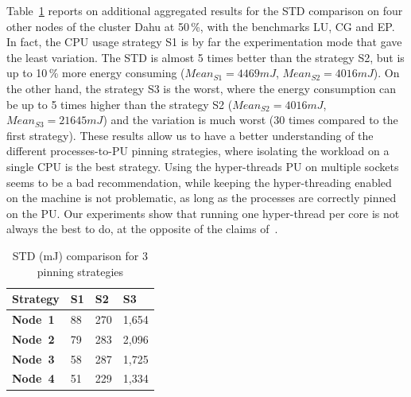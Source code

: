 Table~\ref{table:corespinning} reports on additional aggregated results for the STD comparison on four other nodes of the cluster \textsf{Dahu} at 50\,\%, with the benchmarks \textsf{LU}, \textsf{CG} and \textsf{EP}.
In fact, the CPU usage strategy \textsf{S1} is by far the experimentation mode that gave the least variation.
The STD is almost 5 times better than the strategy \textsf{S2}, but is up to 10\,\% more energy consuming ($Mean_{S1}=4469 mJ$, $Mean_{S2}=4016 mJ$).
On the other hand, the strategy \textsf{S3} is the worst, where the energy consumption can be up to 5 times higher than the strategy \textsf{S2} ($Mean_{S2}=4016 mJ$, $Mean_{S3}=21645 mJ$) and the variation is much worst (30 times compared to the first strategy).
These results allow us to have a better understanding of the different processes-to-PU pinning strategies, where isolating the workload on a single CPU is the best strategy.
Using the hyper-threads PU on multiple sockets seems to be a bad recommendation, while keeping the hyper-threading enabled on the machine is not problematic, as long as the processes are correctly pinned on the PU.
Our experiments show that running one hyper-thread per core is not always the best to do, at the opposite of the claims of~\cite{marathe_empirical_2017_m}.

\begin{table}
    \centering
    \caption{STD (mJ) comparison for 3 pinning strategies}
    \label{table:corespinning}
    \small
    \begin{tabular}{|l|l|l|l|}
        \hline
        \textbf{Strategy} & \textbf{S1} & \textbf{S2} & \textbf{S3} \\
        \hline
        \hline
        \textbf{Node~1}   & 88          & 270         & 1,654       \\
        \hline
        \textbf{Node~2}   & 79          & 283         & 2,096       \\
        \hline
        \textbf{Node~3}   & 58          & 287         & 1,725       \\
        \hline
        \textbf{Node~4}   & 51          & 229         & 1,334       \\
        \hline
    \end{tabular}
\end{table}

